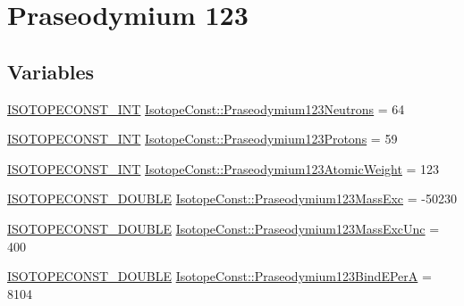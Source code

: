 \hypertarget{group___isotope_const-_praseodymium-_pr123}{}\section{Praseodymium 123}
\label{group___isotope_const-_praseodymium-_pr123}
\subsection*{Variables}
\begin{DoxyCompactItemize}
\item 
\mbox{\hyperlink{group___isotope_const-_macros_ga5f18360b3e99483a35c32d789e62621c}{I\+S\+O\+T\+O\+P\+E\+C\+O\+N\+S\+T\+\_\+\+I\+NT}} \mbox{\hyperlink{group___isotope_const-_praseodymium-_pr123_ga7c10a8c9e243ef2e00639a878fbbbebb}{Isotope\+Const\+::\+Praseodymium123\+Neutrons}} = 64
\item 
\mbox{\hyperlink{group___isotope_const-_macros_ga5f18360b3e99483a35c32d789e62621c}{I\+S\+O\+T\+O\+P\+E\+C\+O\+N\+S\+T\+\_\+\+I\+NT}} \mbox{\hyperlink{group___isotope_const-_praseodymium-_pr123_ga1712d1548112570edf760d5ebf392781}{Isotope\+Const\+::\+Praseodymium123\+Protons}} = 59
\item 
\mbox{\hyperlink{group___isotope_const-_macros_ga5f18360b3e99483a35c32d789e62621c}{I\+S\+O\+T\+O\+P\+E\+C\+O\+N\+S\+T\+\_\+\+I\+NT}} \mbox{\hyperlink{group___isotope_const-_praseodymium-_pr123_ga0c909bdea42b7c28da46ac07062c5cfb}{Isotope\+Const\+::\+Praseodymium123\+Atomic\+Weight}} = 123
\item 
\mbox{\hyperlink{group___isotope_const-_macros_ga8f45a7272ce02c0b4c65c44636ed719a}{I\+S\+O\+T\+O\+P\+E\+C\+O\+N\+S\+T\+\_\+\+D\+O\+U\+B\+LE}} \mbox{\hyperlink{group___isotope_const-_praseodymium-_pr123_gaea23cee7ddc79ef4696f71ef557202e6}{Isotope\+Const\+::\+Praseodymium123\+Mass\+Exc}} = -\/50230
\item 
\mbox{\hyperlink{group___isotope_const-_macros_ga8f45a7272ce02c0b4c65c44636ed719a}{I\+S\+O\+T\+O\+P\+E\+C\+O\+N\+S\+T\+\_\+\+D\+O\+U\+B\+LE}} \mbox{\hyperlink{group___isotope_const-_praseodymium-_pr123_gaaf6ea38e2e76e07945f2179f35e953b4}{Isotope\+Const\+::\+Praseodymium123\+Mass\+Exc\+Unc}} = 400
\item 
\mbox{\hyperlink{group___isotope_const-_macros_ga8f45a7272ce02c0b4c65c44636ed719a}{I\+S\+O\+T\+O\+P\+E\+C\+O\+N\+S\+T\+\_\+\+D\+O\+U\+B\+LE}} \mbox{\hyperlink{group___isotope_const-_praseodymium-_pr123_gaf5fc38fd76c922c16e22cec490d724e6}{Isotope\+Const\+::\+Praseodymium123\+Bind\+E\+PerA}} = 8104

\end{DoxyCompactItemize}
